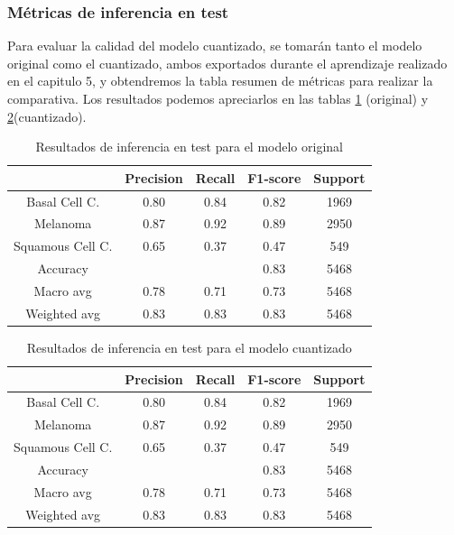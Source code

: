\subsubsection{Métricas de inferencia en test}
Para evaluar la calidad del modelo cuantizado, se tomarán tanto el modelo original como el cuantizado, ambos exportados durante el aprendizaje realizado en el capitulo 5, y obtendremos la tabla resumen de métricas para realizar la comparativa.
Los resultados  podemos apreciarlos en las tablas \ref{tab:maltestorig} (original) y \ref{tab:maltestquant}(cuantizado).

\begin{table}[!ht]
	\centering
	\begin{tabular}{|c|c|c|c|c|}
		\hline
		~ & Precision & Recall & F1-score & Support \\ \hline
		Basal Cell C. & 0.80 & 0.84 & 0.82 & 1969 \\
		Melanoma & 0.87 & 0.92 & 0.89 & 2950 \\
		Squamous Cell C. & 0.65 & 0.37 & 0.47 & 549 \\ \hline
		Accuracy & ~ & ~ & 0.83 & 5468 \\ \hline
		Macro avg & 0.78 & 0.71 & 0.73 & 5468 \\
		Weighted avg & 0.83 & 0.83 & 0.83 & 5468 \\ \hline
	\end{tabular}
	\caption{Resultados de inferencia en test para el modelo original}
	\label{tab:maltestorig}
\end{table}

\begin{table}[!ht]
	\centering
	\begin{tabular}{|c|c|c|c|c|}
		\hline
		~ & Precision & Recall & F1-score & Support \\ \hline
		Basal Cell C. & 0.80 & 0.84 & 0.82 & 1969 \\
		Melanoma & 0.87 & 0.92 & 0.89 & 2950 \\
		Squamous Cell C. & 0.65 & 0.37 & 0.47 & 549 \\ \hline
		Accuracy & ~ & ~ & 0.83 & 5468 \\ \hline
		Macro avg & 0.78 & 0.71 & 0.73 & 5468 \\
		Weighted avg & 0.83 & 0.83 & 0.83 & 5468 \\ \hline
	\end{tabular}
	\caption{Resultados de inferencia en test para el modelo cuantizado}
	\label{tab:maltestquant}
\end{table}

